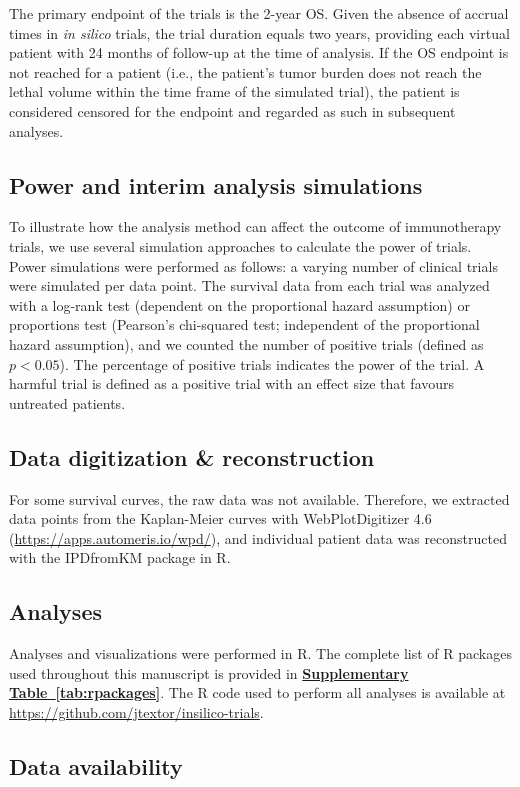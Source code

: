 \documentclass[a4paper,10pt]{article}
\newcommand{\mystab}[1]{\hyperref[#1]{\bfseries Supplementary Table~\ref*{#1}}}
\begin{document}
The primary endpoint of the trials is the 2-year OS. Given the absence of
accrual times in \emph{in silico} trials, the trial duration equals two years, providing 
each virtual patient with 24 months of follow-up at the time of analysis. 
If the OS endpoint is not reached for a patient (i.e., the patient's
tumor burden does not reach the lethal volume within the time frame of the
simulated trial), the patient is considered censored for the endpoint and regarded
as such in subsequent analyses.

\subsection*{Power and interim analysis simulations}
To illustrate how the analysis method can affect the outcome of immunotherapy
trials, we use several simulation approaches to calculate the power of trials.
Power simulations were performed as follows: a varying number of 
clinical trials were simulated per data point. The survival data from each trial was analyzed with a
log-rank test (dependent on the proportional hazard assumption) or proportions
test (Pearson's chi-squared test; independent of the proportional hazard
assumption), and we counted the number of positive trials (defined as $ p < 0.05 $).
The percentage of positive trials indicates the power of the trial. A harmful
trial is defined as a positive trial with an effect size that favours untreated
patients.

\subsection*{Data digitization \& reconstruction}
For some survival curves, the raw data was not available. Therefore, we
extracted data points from the Kaplan-Meier curves with WebPlotDigitizer 4.6
(\url{https://apps.automeris.io/wpd/}), and individual patient data was
reconstructed with the IPDfromKM package in R.

\subsection*{Analyses}
Analyses and visualizations were performed in R. The complete list of R
packages used throughout this manuscript is provided in \mystab{tab:rpackages}.
The R code used to perform all analyses is available at
\url{https://github.com/jtextor/insilico-trials}.

\clearpage


\subsection*{Data availability}
\end{document}
